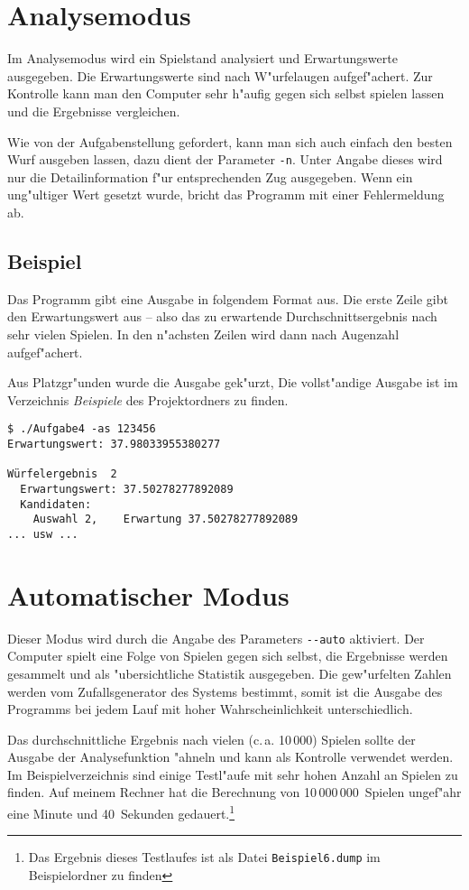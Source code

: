 \documentclass{scrreprt}
\begin{document}
\section{Analysemodus}
Im Analysemodus wird ein Spielstand analysiert und Erwartungswerte ausgegeben.
Die Erwartungswerte sind nach W"urfelaugen aufgef"achert.  Zur Kontrolle kann
man den Computer sehr h"aufig gegen sich selbst spielen lassen und die
Ergebnisse vergleichen.

Wie von der Aufgabenstellung gefordert, kann man sich auch einfach den besten
Wurf ausgeben lassen, dazu dient der Parameter \texttt{-n}.  Unter Angabe dieses
wird nur die Detailinformation f"ur entsprechenden Zug ausgegeben. Wenn ein
ung"ultiger Wert gesetzt wurde, bricht das Programm mit einer Fehlermeldung ab.

\subsection*{Beispiel}
Das Programm gibt eine Ausgabe in folgendem Format aus. Die erste Zeile gibt den
Erwartungswert aus -- also das zu erwartende Durchschnittsergebnis nach sehr
vielen Spielen.  In den n"achsten Zeilen wird dann nach Augenzahl aufgef"achert.

Aus Platzgr"unden wurde die Ausgabe gek"urzt, Die vollst"andige Ausgabe ist im
Verzeichnis \emph{Beispiele} des Projektordners zu finden.

\begin{verbatim}
$ ./Aufgabe4 -as 123456
Erwartungswert: 37.98033955380277

Würfelergebnis  2
  Erwartungswert: 37.50278277892089
  Kandidaten:
    Auswahl 2,    Erwartung 37.50278277892089
... usw ...
\end{verbatim}

\section{Automatischer Modus}
Dieser Modus wird durch die Angabe des Parameters \texttt{-\/-auto} aktiviert.
Der Computer spielt eine Folge von Spielen gegen sich selbst, die Ergebnisse
werden gesammelt und als "ubersichtliche Statistik ausgegeben.  Die gew"urfelten
Zahlen werden vom Zufallsgenerator des Systems bestimmt, somit ist die Ausgabe
des Programms bei jedem Lauf mit hoher Wahrscheinlichkeit unterschiedlich.

Das durchschnittliche Ergebnis nach vielen (c.\,a. 10\,000) Spielen sollte der
Ausgabe der Analysefunktion "ahneln und kann als Kontrolle verwendet werden. Im
Beispielverzeichnis sind einige Testl"aufe mit sehr hohen Anzahl an Spielen zu
finden. Auf meinem Rechner hat die Berechnung von 10\,000\,000~Spielen ungef"ahr
eine Minute und 40~Sekunden gedauert.\footnote{Das Ergebnis dieses Testlaufes
ist als Datei \texttt{Beispiel6.dump} im Beispielordner zu finden}
\end{document}

